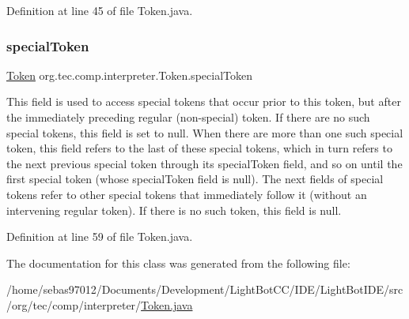 Definition at line 45 of file Token.\+java.

\mbox{\label{classorg_1_1tec_1_1comp_1_1interpreter_1_1_token_afdd78d6313c00d7ed575e368db5e10aa}} 
\subsubsection{\texorpdfstring{special\+Token}{specialToken}}
{\footnotesize\ttfamily \mbox{\hyperlink{classorg_1_1tec_1_1comp_1_1interpreter_1_1_token}{Token}} org.\+tec.\+comp.\+interpreter.\+Token.\+special\+Token}

This field is used to access special tokens that occur prior to this token, but after the immediately preceding regular (non-\/special) token. If there are no such special tokens, this field is set to null. When there are more than one such special token, this field refers to the last of these special tokens, which in turn refers to the next previous special token through its special\+Token field, and so on until the first special token (whose special\+Token field is null). The next fields of special tokens refer to other special tokens that immediately follow it (without an intervening regular token). If there is no such token, this field is null. 

Definition at line 59 of file Token.\+java.



The documentation for this class was generated from the following file\+:\begin{DoxyCompactItemize}
\item 
/home/sebas97012/\+Documents/\+Development/\+Light\+Bot\+C\+C/\+I\+D\+E/\+Light\+Bot\+I\+D\+E/src/org/tec/comp/interpreter/\mbox{\hyperlink{_token_8java}{Token.\+java}}\end{DoxyCompactItemize}
